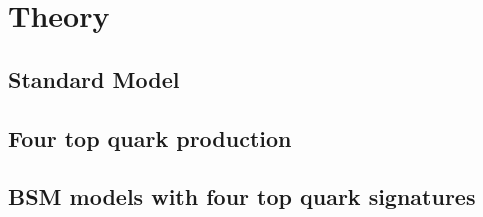 \chapter{Theory}
\label{c:theory}


\section{Standard Model}

\section{Four top quark production}

\section{BSM models with four top quark signatures}